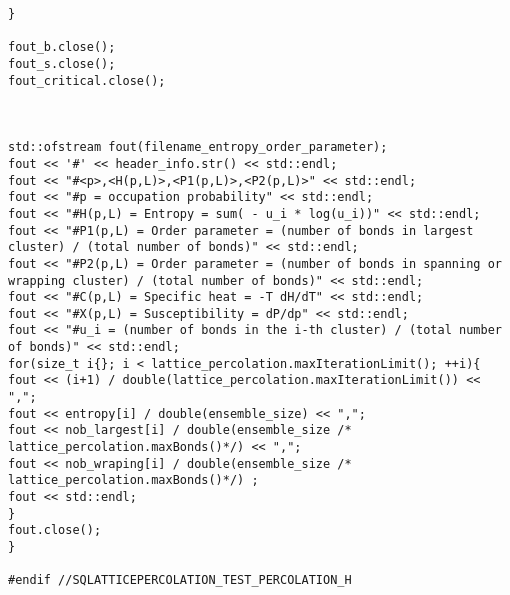 \begin{lstlisting}[style=CStyle]
}

fout_b.close();
fout_s.close();
fout_critical.close();



std::ofstream fout(filename_entropy_order_parameter);
fout << '#' << header_info.str() << std::endl;
fout << "#<p>,<H(p,L)>,<P1(p,L)>,<P2(p,L)>" << std::endl;
fout << "#p = occupation probability" << std::endl;
fout << "#H(p,L) = Entropy = sum( - u_i * log(u_i))" << std::endl;
fout << "#P1(p,L) = Order parameter = (number of bonds in largest cluster) / (total number of bonds)" << std::endl;
fout << "#P2(p,L) = Order parameter = (number of bonds in spanning or wrapping cluster) / (total number of bonds)" << std::endl;
fout << "#C(p,L) = Specific heat = -T dH/dT" << std::endl;
fout << "#X(p,L) = Susceptibility = dP/dp" << std::endl;
fout << "#u_i = (number of bonds in the i-th cluster) / (total number of bonds)" << std::endl;
for(size_t i{}; i < lattice_percolation.maxIterationLimit(); ++i){
fout << (i+1) / double(lattice_percolation.maxIterationLimit()) << ",";
fout << entropy[i] / double(ensemble_size) << ",";
fout << nob_largest[i] / double(ensemble_size /* lattice_percolation.maxBonds()*/) << ",";
fout << nob_wraping[i] / double(ensemble_size /* lattice_percolation.maxBonds()*/) ;
fout << std::endl;
}
fout.close();
}

#endif //SQLATTICEPERCOLATION_TEST_PERCOLATION_H
\end{lstlisting}